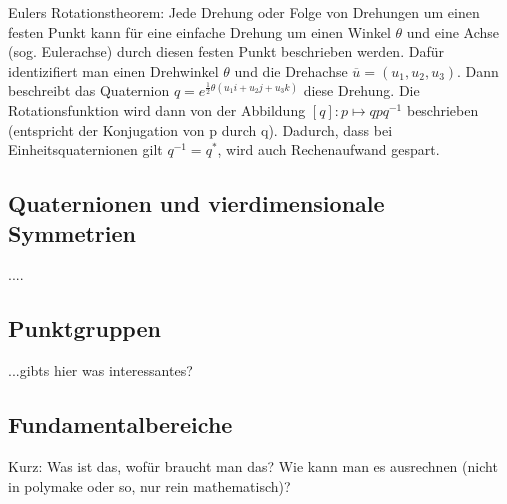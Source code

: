 Eulers Rotationstheorem: Jede Drehung oder Folge von Drehungen um einen festen Punkt kann für eine einfache Drehung um einen Winkel $\theta$ und eine Achse (sog. Eulerachse) durch diesen festen Punkt beschrieben werden. Dafür identizifiert man einen 
Drehwinkel $\theta$ und die Drehachse $\overline{u} = (u_1,u_2,u_3)$.
Dann beschreibt das Quaternion $q = e^{\frac{1}{2}\theta(u_1i + u_2j + u_3k)}$ diese Drehung.
Die Rotationsfunktion wird dann von der Abbildung $[q]: p \mapsto q p q^{-1}$ beschrieben (entspricht der Konjugation von p durch q).
Dadurch, dass bei Einheitsquaternionen gilt $q^{-1} = q^*$, wird auch Rechenaufwand gespart.

\subsection{Quaternionen und vierdimensionale Symmetrien}
....

\subsection{Punktgruppen}
...gibts hier was interessantes?

\subsection{Fundamentalbereiche}\label{fundamentalbereich}
Kurz: Was ist das, wofür braucht man das? Wie kann man es ausrechnen (nicht in polymake oder so, nur rein mathematisch)?
